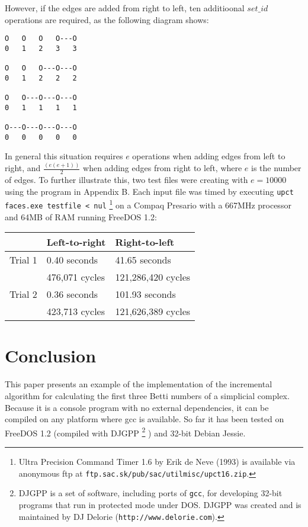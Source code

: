 \documentclass{article}
\begin{document}
However, if the edges are added from right to left, ten
additioonal $set\_id$ operations are required, as the
following diagram shows:

\begin{verbatim}
O   O   O   O---O
0   1   2   3   3

O   O   O---O---O
0   1   2   2   2

O   O---O---O---O
0   1   1   1   1

O---O---O---O---O
0   0   0   0   0
\end{verbatim}

In general this situation requires $e$ operations when adding
edges from left to right, and $\frac{(e(e+1))}{2}$ when adding edges
from right to left, where $e$ is the number of edges.
To further illustrate this, two test files were creating
with $e=10000$ using the program in Appendix B.
Each input file was timed by executing
\texttt{upct faces.exe testfile \textless\ nul}
\footnote{
    Ultra Precision Command Timer 1.6 by Erik de Neve (1993)
    is available via anonymous ftp at
    \texttt{ftp.sac.sk/pub/sac/utilmisc/upct16.zip}.
}
on a Compaq Presario with a 667MHz processor and 64MB of RAM running
FreeDOS 1.2:

\begin{tabular}{|l|l|l|}
\hline
&Left-to-right&Right-to-left\\
\hline
Trial 1&0.40 seconds&41.65 seconds\\
&476,071 cycles&121,286,420 cycles\\
\hline
Trial 2&0.36 seconds&101.93 seconds\\
&423,713 cycles&121,626,389 cycles\\
\hline
\end{tabular}

\section{Conclusion}
This paper presents an example of the implementation of
the incremental algorithm for calculating the first three
Betti numbers of a simplicial complex. Because it is a
console program with no external dependencies, it can
be compiled on any platform where gcc is
available. So far it has been tested on FreeDOS 1.2
(compiled with DJGPP
\footnote{DJGPP is a set of software, including ports of
\texttt{gcc}, for developing 32-bit programs that run in
protected mode under DOS. DJGPP was created and is maintained
by DJ Delorie (\texttt{http://www.delorie.com}).}
)
and 32-bit Debian Jessie.
\end{document}
